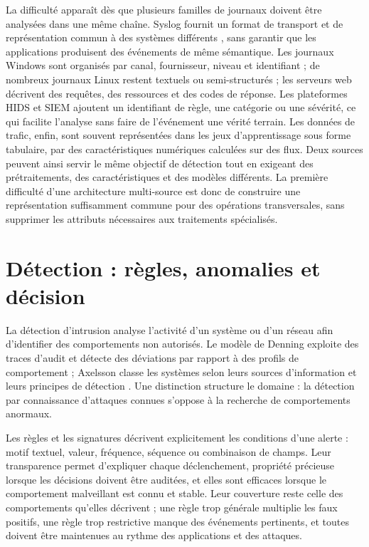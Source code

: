 La difficulté apparaît dès que plusieurs familles de journaux doivent être analysées dans une même chaîne. Syslog fournit un format de transport et de représentation commun à des systèmes différents \cite{rfc5424}, sans garantir que les applications produisent des événements de même sémantique. Les journaux Windows sont organisés par canal, fournisseur, niveau et identifiant ; de nombreux journaux Linux restent textuels ou semi-structurés ; les serveurs web décrivent des requêtes, des ressources et des codes de réponse. Les plateformes HIDS et SIEM ajoutent un identifiant de règle, une catégorie ou une sévérité, ce qui facilite l'analyse sans faire de l'événement une vérité terrain. Les données de trafic, enfin, sont souvent représentées dans les jeux d'apprentissage sous forme tabulaire, par des caractéristiques numériques calculées sur des flux. Deux sources peuvent ainsi servir le même objectif de détection tout en exigeant des prétraitements, des caractéristiques et des modèles différents. La première difficulté d'une architecture multi-source est donc de construire une représentation suffisamment commune pour des opérations transversales, sans supprimer les attributs nécessaires aux traitements spécialisés.

\section{Détection : règles, anomalies et décision}

La détection d'intrusion analyse l'activité d'un système ou d'un réseau afin d'identifier des comportements non autorisés. Le modèle de Denning exploite des traces d'audit et détecte des déviations par rapport à des profils de comportement \cite{denning1987intrusion} ; Axelsson classe les systèmes selon leurs sources d'information et leurs principes de détection \cite{axelsson2000intrusion}. Une distinction structure le domaine : la détection par connaissance d'attaques connues s'oppose à la recherche de comportements anormaux.

Les règles et les signatures décrivent explicitement les conditions d'une alerte : motif textuel, valeur, fréquence, séquence ou combinaison de champs. Leur transparence permet d'expliquer chaque déclenchement, propriété précieuse lorsque les décisions doivent être auditées, et elles sont efficaces lorsque le comportement malveillant est connu et stable. Leur couverture reste celle des comportements qu'elles décrivent ; une règle trop générale multiplie les faux positifs, une règle trop restrictive manque des événements pertinents, et toutes doivent être maintenues au rythme des applications et des attaques.

